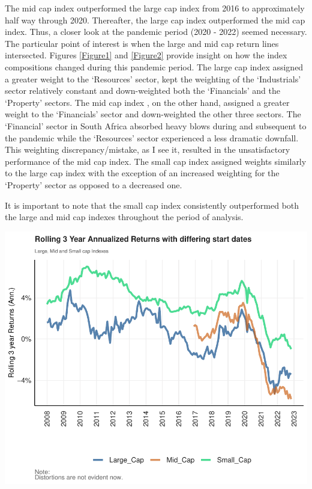 \documentclass[11pt,preprint, authoryear]{elsarticle}
\let\origfigure\figure
\let\endorigfigure\endfigure
\renewenvironment{figure}[1][2] {
    \expandafter\origfigure\expandafter[H]
} {
    \endorigfigure
}
\numberwithin{equation}{section}
\numberwithin{figure}{section}
\numberwithin{table}{section}
\begin{document}
The mid cap index outperformed the large cap index from 2016 to
approximately half way through 2020. Thereafter, the large cap index
outperformed the mid cap index. Thus, a closer look at the pandemic
period (2020 - 2022) seemed necessary. The particular point of interest
is when the large and mid cap return lines intersected. Figures
\ref{Figure1} and \ref{Figure2} provide insight on how the index
compositions changed during this pandemic period. The large cap index
assigned a greater weight to the `Resources' sector, kept the weighting
of the `Industrials' sector relatively constant and down-weighted both
the `Financials' and the `Property' sectors. The mid cap index , on the
other hand, assigned a greater weight to the `Financials' sector and
down-weighted the other three sectors. The `Financial' sector in South
Africa absorbed heavy blows during and subsequent to the pandemic while
the `Resources' sector experienced a less dramatic downfall. This
weighting discrepancy/mistake, as I see it, resulted in the
unsatisfactory performance of the mid cap index. The small cap index
assigned weights similarly to the large cap index with the exception of
an increased weighting for the `Property' sector as opposed to a
decreased one.

It is important to note that the small cap index consistently
outperformed both the large and mid cap indexes throughout the period of
analysis.

\begin{figure}[H]

{\centering \includegraphics{Volatility-of-Shares_files/figure-latex/Figure7-1} 

}

\caption{Rolling Annualised Returns of the Indexes \label{Figure7}}\label{fig:Figure7}
\end{figure}
\end{document}
